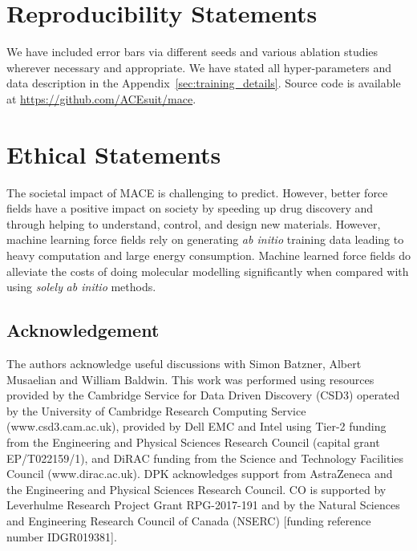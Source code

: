 \documentclass{article}
\begin{document}
\section{Reproducibility Statements}

We have included error bars via different seeds and various ablation studies wherever necessary and appropriate.
We have stated all hyper-parameters and data description in the Appendix~\ref{sec:training_details}.
Source code is available at \url{https://github.com/ACEsuit/mace}.

\section{Ethical Statements}

The societal impact of MACE is challenging to predict.
However, better force fields have a positive impact on society by speeding up drug discovery and through helping to understand, control, and design new materials.
However, machine learning force fields rely on generating \textit{ab initio} training data leading to heavy computation and large energy consumption. Machine learned force fields do alleviate the costs of doing molecular modelling significantly when compared with using \textit{solely} \textit{ab initio} methods.

\begin{ack}

\section{Acknowledgement}

The authors acknowledge useful discussions with Simon Batzner, Albert Musaelian and William Baldwin. This work was performed using resources provided by the Cambridge Service for Data Driven Discovery (CSD3) operated by the University of Cambridge Research Computing Service (www.csd3.cam.ac.uk), provided by Dell EMC and Intel using Tier-2 funding from the Engineering and Physical Sciences Research Council (capital grant EP/T022159/1), and DiRAC funding from the Science and Technology Facilities Council (www.dirac.ac.uk). DPK acknowledges support from AstraZeneca and the Engineering and Physical Sciences Research Council. CO is supported by Leverhulme Research Project Grant RPG-2017-191 and by the Natural Sciences and Engineering Research Council of Canada (NSERC) [funding reference number IDGR019381].

\end{ack}
\end{document}
